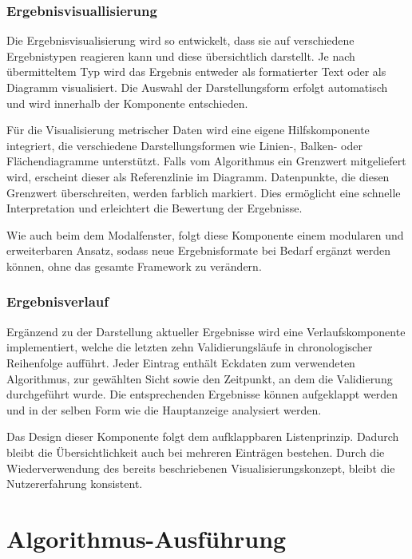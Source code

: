 \subsubsection*{Ergebnisvisuallisierung}
\label{subsubsec:ergebnisvis}

Die Ergebnisvisualisierung wird so entwickelt, dass sie auf verschiedene Ergebnistypen reagieren kann und diese übersichtlich darstellt. Je nach übermitteltem Typ wird das Ergebnis entweder als formatierter Text oder als Diagramm visualisiert. Die Auswahl der Darstellungsform erfolgt automatisch und wird innerhalb der Komponente entschieden.

Für die Visualisierung metrischer Daten wird eine eigene Hilfskomponente integriert, die verschiedene Darstellungsformen wie Linien-, Balken- oder Flächendiagramme unterstützt. Falls vom Algorithmus ein Grenzwert mitgeliefert wird, erscheint dieser als Referenzlinie im Diagramm. Datenpunkte, die diesen Grenzwert überschreiten, werden farblich markiert. Dies ermöglicht eine schnelle Interpretation und erleichtert die Bewertung der Ergebnisse.

Wie auch beim dem Modalfenster, folgt diese Komponente einem modularen und erweiterbaren Ansatz, sodass neue Ergebnisformate bei Bedarf ergänzt werden können, ohne das gesamte Framework zu verändern.

\subsubsection*{Ergebnisverlauf}
\label{subsubsec:ergebnisverlauf}


Ergänzend zu der Darstellung aktueller Ergebnisse wird eine Verlaufskomponente implementiert, welche die letzten zehn Validierungsläufe in chronologischer Reihenfolge aufführt. Jeder Eintrag enthält Eckdaten zum verwendeten Algorithmus, zur gewählten Sicht sowie den Zeitpunkt, an dem die Validierung durchgeführt wurde. Die entsprechenden Ergebnisse können aufgeklappt werden und in der selben Form wie die Hauptanzeige analysiert werden.

Das Design dieser Komponente folgt dem aufklappbaren Listenprinzip. Dadurch bleibt die Übersichtlichkeit auch bei mehreren Einträgen bestehen. Durch die Wiederverwendung des bereits beschriebenen Visualisierungskonzept, bleibt die Nutzererfahrung konsistent.

\section{Algorithmus-Ausführung}

